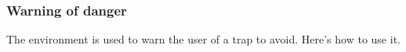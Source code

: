 \documentclass[10pt, a4paper]{article}
\begin{document}

\subsubsection{Warning of danger}

The  environment is used to warn the user of a trap to avoid. Here's how to use it.

\end{document}
